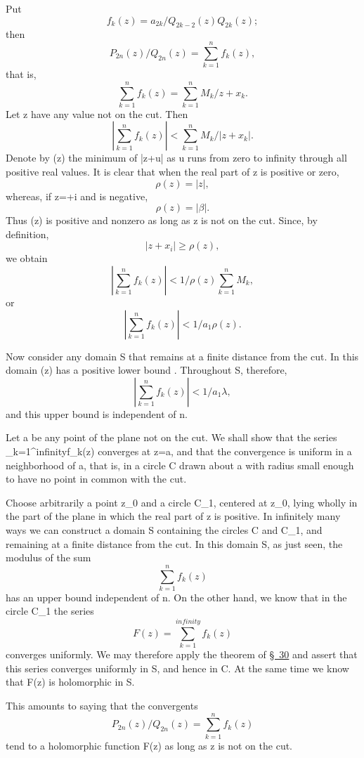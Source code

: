 \documentclass[
  paper=b5,
  fontsize=13pt,
  twoside,
  headings=normal,
  bookmarkpackage=false
]{scrartcl}
\theoremstyle{stieltjesplain}
\theoremstyle{stieltjesdefinition}
\def\({}\def\){}%
\def\frac#1#2{#1/#2}%
\def\infty{infinity}%
\begin{document}
Put
\[
 f_k(z)=\frac{a_{2k}}{Q_{2k-2}(z)Q_{2k}(z)};
\]
then
\[
 \frac{P_{2n}(z)}{Q_{2n}(z)}=\sum_{k=1}^{n}f_k(z),
\]
that is,
\[
 \sum_{k=1}^{n}f_k(z)=\sum_{k=1}^{n}\frac{M_k}{z+x_k}.
\]
Let \(z\) have any value not on the cut. Then
\[
 \left|\sum_{k=1}^{n}f_k(z)\right|
 <\sum_{k=1}^{n}\frac{M_k}{|z+x_k|}.
\]
Denote by \(\rho(z)\) the minimum of \(|z+u|\) as \(u\) runs from zero
to infinity through all positive real values. It is clear that when the
real part of \(z\) is positive or zero,
\[
 \rho(z)=|z|,
\]
whereas, if \(z=\alpha+\beta i\) and \(\alpha\) is negative,
\[
 \rho(z)=|\beta|.
\]
Thus \(\rho(z)\) is positive and nonzero as long as \(z\) is not on the
cut. Since, by definition,
\[
 |z+x_i|\geq\rho(z),
\]
we obtain
\[
 \left|\sum_{k=1}^{n}f_k(z)\right|
 <\frac1{\rho(z)}\sum_{k=1}^{n}M_k,
\]
or
\[
 \left|\sum_{k=1}^{n}f_k(z)\right|<\frac1{a_1\rho(z)}.
\]

Now consider any domain \(S\) that remains at a finite distance from the
cut. In this domain \(\rho(z)\) has a positive lower bound \(\lambda\).
Throughout \(S\), therefore,
\[
 \left|\sum_{k=1}^{n}f_k(z)\right|<\frac1{a_1\lambda},
\]
and this upper bound is independent of \(n\).

Let \(a\) be any point of the plane not on the cut. We shall show that
the series \(\sum_{k=1}^{\infty}f_k(z)\) converges at \(z=a\), and that
the convergence is uniform in a neighborhood of \(a\), that is, in a
circle \(C\) drawn about \(a\) with radius small enough to have no point
in common with the cut.

Choose arbitrarily a point \(z_0\) and a circle \(C_1\), centered at
\(z_0\), lying wholly in the part of the plane in which the real part of
\(z\) is positive. In infinitely many ways we can construct a domain
\(S\) containing the circles \(C\) and \(C_1\), and remaining at a finite
distance from the cut. In this domain \(S\), as just seen, the modulus of
the sum
\[
 \sum_{k=1}^{n}f_k(z)
\]
has an upper bound independent of \(n\). On the other hand, we know that
in the circle \(C_1\) the series
\[
 F(z)=\sum_{k=1}^{\infty}f_k(z)
\]
converges uniformly. We may therefore apply the theorem of
\hyperref[sec:30]{\S~30} and assert that this series converges uniformly
in \(S\), and hence in \(C\). At the same time we know that \(F(z)\) is
holomorphic in \(S\).

This amounts to saying that the convergents
\[
 \frac{P_{2n}(z)}{Q_{2n}(z)}=\sum_{k=1}^{n}f_k(z)
\]
tend to a holomorphic function \(F(z)\) as long as \(z\) is not on the
cut.
\end{document}
